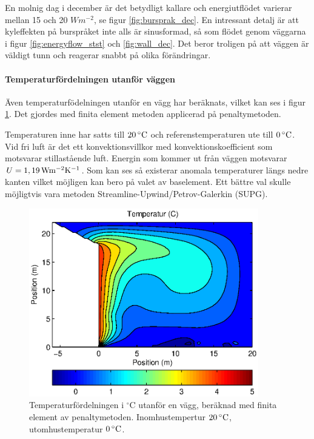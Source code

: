  En molnig dag  i december är det betydligt kallare och energiutflödet varierar mellan 15 och 20 $\unit{W m^{-2}}$, se figur \ref{fig:bursprak_dec}. En intressant detalj är att kyleffekten på burspråket inte alls är sinusformad, så som flödet genom väggarna i figur \ref{fig:energyflow_stst} och \ref{fig:wall_dec}. Det beror troligen på att väggen är väldigt tunn och reagerar snabbt på olika förändringar.

\paragraph{Temperaturfördelningen utanför väggen}

Även temperaturfödelningen utanför en vägg har beräknats, vilket kan ses i figur \ref{fig:temp_dist}. Det gjordes med finita element metoden applicerad på penaltymetoden.

Temperaturen inne har satts till $\unit[20]{^\circ C}$ och referenstemperaturen ute till 
$\unit[0]{^\circ C}$. Vid fri luft är det ett konvektionsvillkor med konvektionskoefficient 
som motsvarar stillastående luft. Energin som kommer ut från väggen motsvarar 
$U = \unit[1,19]{Wm^{-2}K^{-1}}$. Som kan ses så existerar anomala temperaturer längs 
nedre kanten vilket möjligen kan bero på valet av baselement. Ett bättre val skulle möjligtvis vara metoden Streamline-Upwind/Petrov-Galerkin (SUPG).


\begin{figure}[hpbt]
\centering
\includegraphics[width=10cm]{images/convectemperature.eps}
\caption{\label{fig:temp_dist}Temperaturfördelningen i $^\circ\mbox{C}$ utanför en vägg, beräknad med finita element av penaltymetoden. Inomhustempertur $\unit[20]{^\circ C}$, utomhustemperatur $\unit[0]{^\circ C}$.}
\end{figure}

